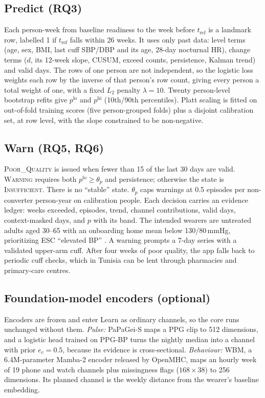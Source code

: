\documentclass[conference]{IEEEtran}
\begin{document}
\subsection{Predict (RQ3)}
Each person-week from baseline readiness to the week before $t_{\mathrm{ref}}$ is a landmark row, labelled 1 if $t_{\mathrm{ref}}$ falls within 26 weeks. It uses only past data: level terms (age, sex, BMI, last cuff SBP/DBP and its age, 28-day nocturnal HR), change terms ($d$, its 12-week slope, CUSUM, exceed counts, persistence, Kalman trend) and valid days. The rows of one person are not independent, so the logistic loss weights each row by the inverse of that person's row count, giving every person a total weight of one, with a fixed $L_2$ penalty $\lambda=10$. Twenty person-level bootstrap refits give $p^{\mathrm{lo}}$ and $p^{\mathrm{hi}}$ (10th/90th percentiles). Platt scaling is fitted on out-of-fold training scores (five person-grouped folds) plus a disjoint calibration set, at row level, with the slope constrained to be non-negative.

\subsection{Warn (RQ5, RQ6)}
\textsc{Poor\_Quality} is issued when fewer than 15 of the last 30 days are valid. \textsc{Warning} requires both $p^{\mathrm{lo}}\geq\theta_p$ and persistence; otherwise the state is \textsc{Insufficient}. There is no ``stable'' state. $\theta_p$ caps warnings at 0.5 episodes per non-converter person-year on calibration people. Each decision carries an evidence ledger: weeks exceeded, episodes, trend, channel contributions, valid days, context-masked days, and $p$ with its band. The intended wearers are untreated adults aged 30--65 with an onboarding home mean below 130/80\,mmHg, prioritizing ESC ``elevated BP'' \cite{esc2024}. A warning prompts a 7-day series with a validated upper-arm cuff. After four weeks of poor quality, the app falls back to periodic cuff checks, which in Tunisia can be lent through pharmacies and primary-care centres.

\subsection{Foundation-model encoders (optional)}
Encoders are frozen and enter Learn as ordinary channels, so the core runs unchanged without them. \emph{Pulse:} PaPaGei-S maps a PPG clip to 512 dimensions, and a logistic head trained on PPG-BP turns the nightly median into a channel with prior $e_c=0.5$, because its evidence is cross-sectional. \emph{Behaviour:} WBM, a 6.4M-parameter Mamba-2 encoder released by OpenMHC, maps an hourly week of 19 phone and watch channels plus missingness flags ($168\times38$) to 256 dimensions. Its planned channel is the weekly distance from the wearer's baseline embedding.
\end{document}
